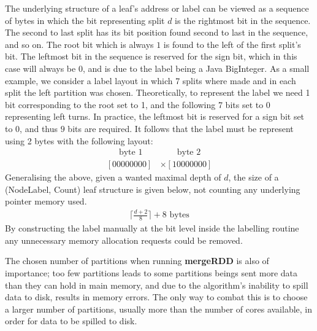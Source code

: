 \documentclass{report}
\begin{document}
The underlying structure of a leaf's address or label can be viewed as a 
sequence of bytes in which the bit representing split $d$ is the rightmost bit in the sequence. The second to last split has its bit position found second to last in the sequence, and so on. The 
root bit which is always $1$ is found to the left of the first split's bit. The leftmost bit in the sequence is reserved for the sign bit, which in this case will always be 0, and is due to 
the label being a Java BigInteger. As a small example, we consider a label layout in which 7 splits where made and in each split the left partition was chosen. Theoretically, to represent the label we need 1 bit 
corresponding to the root set to 1, and the following 7 bits set to 0 representing left turns. In practice, the leftmost bit is reserved for a sign bit set to $0$, and thus $9$ bits are required. It follows that the label 
must be represent using 2 bytes with the following layout:
\begin{align*}
	\quad \ \ \text{byte 1} \ \quad &\quad \quad \text{byte 2}\\
	[00000000] &\times [10000000]
\end{align*}
Generalising the above, given a wanted maximal depth of $d$, the size of a (NodeLabel, Count) leaf structure is given below, not counting any underlying pointer memory used.
\begin{align*}
	\bigg\lceil\frac{d + 2}{8}\bigg\rceil + 8 \text{ bytes}
\end{align*}
By constructing the label manually at the bit level inside the labelling routine any unnecessary memory allocation requests could be removed.

The chosen number of partitions when running \textbf{mergeRDD} is also of importance; too few partitions leads to some partitions beings sent more data than they can hold in main memory, and due to the algorithm's
inability to spill data to disk, results in memory errors. The only way to combat this is to choose a larger number of partitions, usually more than the number of cores available, in order for data to be spilled to disk.
\end{document}
